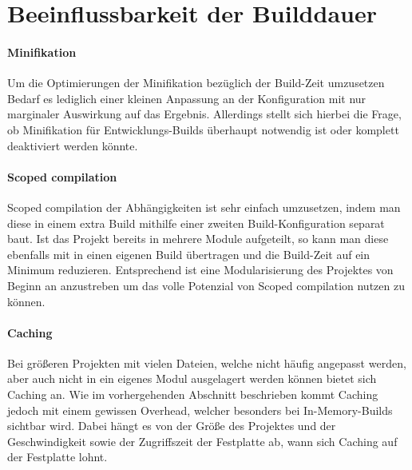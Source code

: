 \documentclass[11pt]{report}
\begin{document}
		
		\section{Beeinflussbarkeit der Builddauer}
			\paragraph{Minifikation} Um die Optimierungen der Minifikation bezüglich der Build-Zeit umzusetzen Bedarf es lediglich einer kleinen Anpassung an der Konfiguration mit nur marginaler Auswirkung auf das Ergebnis. Allerdings stellt sich hierbei die Frage, ob Minifikation für Entwicklungs-Builds überhaupt notwendig ist oder komplett deaktiviert werden könnte. 
			\paragraph{Scoped compilation} Scoped compilation der Abhängigkeiten ist sehr einfach umzusetzen, indem man diese in einem extra Build mithilfe einer zweiten Build-Konfiguration separat baut. Ist das Projekt bereits in mehrere Module aufgeteilt, so kann man diese ebenfalls mit in einen eigenen Build übertragen und die Build-Zeit auf ein Minimum reduzieren. Entsprechend ist eine Modularisierung des Projektes von Beginn an anzustreben um das volle Potenzial von Scoped compilation nutzen zu können.
			\paragraph{Caching} Bei größeren Projekten mit vielen Dateien, welche nicht häufig angepasst werden, aber auch nicht in ein eigenes Modul ausgelagert werden können bietet sich Caching an. Wie im vorhergehenden Abschnitt beschrieben kommt Caching jedoch mit einem gewissen Overhead, welcher besonders bei In-Memory-Builds sichtbar wird. Dabei hängt es von der Größe des Projektes und der Geschwindigkeit sowie der Zugriffszeit der Festplatte ab, wann sich Caching auf der Festplatte lohnt.
\end{document}
